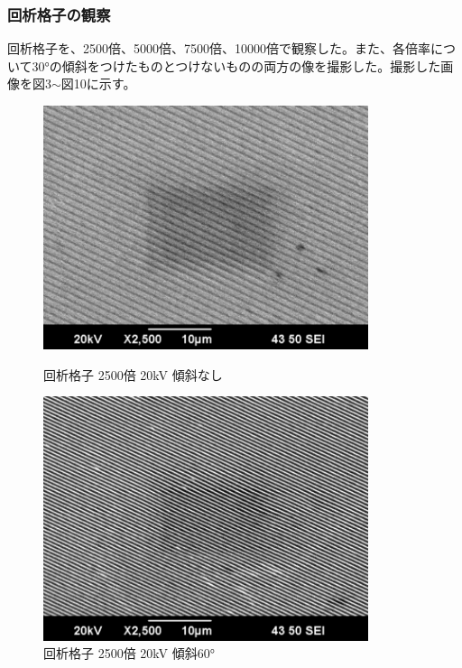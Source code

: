\documentclass[a4paper,11pt]{jsarticle}
\begin{document}
\subsubsection{回析格子の観察}
回析格子を、2500倍、5000倍、7500倍、10000倍で観察した。また、各倍率について30°の傾斜をつけたものとつけないものの両方の像を撮影した。撮影した画像を図3$\sim$図10に示す。\\
\begin{figure}[H]
  \begin{minipage}{0.5\hsize}
    \begin{center}
      \includegraphics[width=0.85\textwidth]{figs/0523/kaisetukousi/2500_20kV.pdf}
    \end{center}
    \caption{回析格子 2500倍 20kV 傾斜なし}
  \end{minipage}
  \begin{minipage}{0.5\hsize}
    \begin{center}
      \includegraphics[width=0.85\textwidth]{figs/0523/kaisetukousi/2500_20kV_60.pdf}
    \end{center}
    \caption{回析格子 2500倍 20kV 傾斜60°}
  \end{minipage}
\end{figure}
\end{document}
